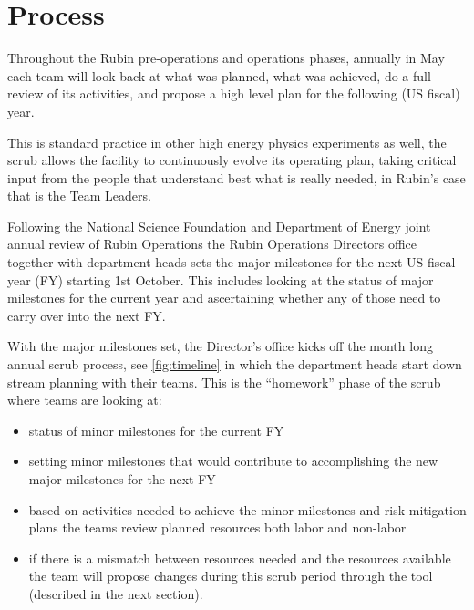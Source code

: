 \section{Process} \label{sec:process}


Throughout the Rubin pre-operations and operations phases, annually in May each team will look back at what was planned, what was achieved, do a full review of its activities, and propose a high level plan for the following (US fiscal) year.

This is standard practice in other high energy physics experiments as well, the scrub allows the facility to continuously evolve its operating plan, taking critical input from the people that understand best what is really needed, in Rubin’s case that is the Team Leaders.

Following the National Science Foundation and Department of Energy joint annual review of Rubin Operations the Rubin Operations Directors office together with department heads sets the major milestones for the next US fiscal year (FY) starting 1st October. This includes looking at the status of major milestones for the current year and ascertaining whether any of those need to carry over into the next FY.

With the major milestones set, the Director’s office kicks off the month long annual scrub process, see \autoref{fig:timeline} in which the department heads start down stream planning with their teams. This is the “homework” phase of the scrub where teams are looking at:

\begin{itemize}
\item status of minor milestones for the current FY
\item setting minor milestones that would contribute to accomplishing the new major milestones for the next FY
\item based on activities needed to achieve the minor milestones and risk mitigation plans the teams review planned resources both labor and non-labor
\item if there is a mismatch between resources needed and the resources available the team will propose changes during this scrub period through the tool (described in the next section).

\end{itemize}


